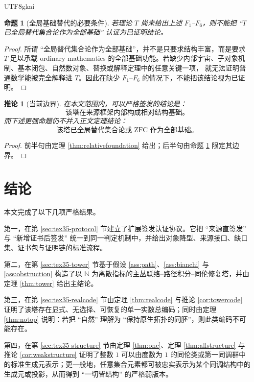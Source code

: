 \documentclass[12pt]{article}
\newtheorem{proposition}{命题}[section]
\newtheorem{corollary}{推论}[section]
\newcommand{\NN}{\mathbb{N}}
\begin{document}
\begin{CJK*}{UTF8}{gkai}
\begin{proposition}[全局基础替代的必要条件]\label{prop:foundationneed}
若理论 $T$ 尚未给出上述 $F_1$--$F_6$，则不能把 ``$T$ 已全局替代集合论作为全部基础'' 认证为已证明结论。
\end{proposition}

\begin{proof}
所谓 ``全局替代集合论作为全部基础''，并不是只要求结构丰富，而是要求 $T$ 足以承载 ordinary mathematics 的全部基础功能。若缺少内部宇宙、子对象机制、基本闭包、自然数对象、替换或解释定理中的任意关键一项，
  就无法证明普通数学能被完全解释进 $T$。因此在缺少 $F_1$--$F_6$ 的情况下，不能把该结论视为已证明。
\end{proof}

\begin{corollary}[当前边界]
在本文范围内，可以严格签发的结论是：
\[
\text{该塔在来源框架内部构成相对结构基础。}
\]
而下述更强命题仍不并入正文定理结论：
\[
\text{该塔已全局替代集合论或 ZFC 作为全部基础。}
\]
\end{corollary}

\begin{proof}
前半句由定理 \ref{thm:relativefoundation} 给出；后半句由命题 \ref{prop:foundationneed} 限定其边界。
\end{proof}

\section{结论}
\label{sec:tex35-conclusion}

本文完成了以下几项严格结果。

第一，在第 \ref{sec:tex35-protocol} 节建立了扩展签发认证协议。它把 ``来源直签发'' 与 ``新增证书后签发'' 统一到同一判定机制中，并给出对象降型、来源接口、缺口集、证书包与证明链的标准流程。

第二，在第 \ref{sec:tex35-tower} 节基于假设 \ref{ass:path}、\ref{ass:bianchi} 与 \ref{ass:obstruction} 构造了以 $\NN$
  为离散指标的主丛联络--路径积分--同伦修复塔，并由定理 \ref{thm:tower} 给出主结论。

第三，在第 \ref{sec:tex35-realcode} 节由定理 \ref{thm:realcode} 与推论 \ref{cor:towercode} 证明了该塔存在显式、无选择、可恢复的单一实数总编码；同时由定理 \ref{thm:notop} 说明：若把 ``自然'' 理解为 ``保持原生拓扑的同胚''，则此类编码不可能存在。

第四，在第 \ref{sec:tex35-structure} 节由定理 \ref{thm:one}、定理 \ref{thm:allstructure} 与推论 \ref{cor:weakstructure} 证明了整数 $1$
  可以由度数为 $1$ 的同伦类或第一同调群中的标准生成元表示；更一般地，任意集合元素都可被忠实表示为某个同调结构中的生成元或投影，从而得到 ``一切皆结构'' 的严格弱版本。


\end{CJK*}
\end{document}
